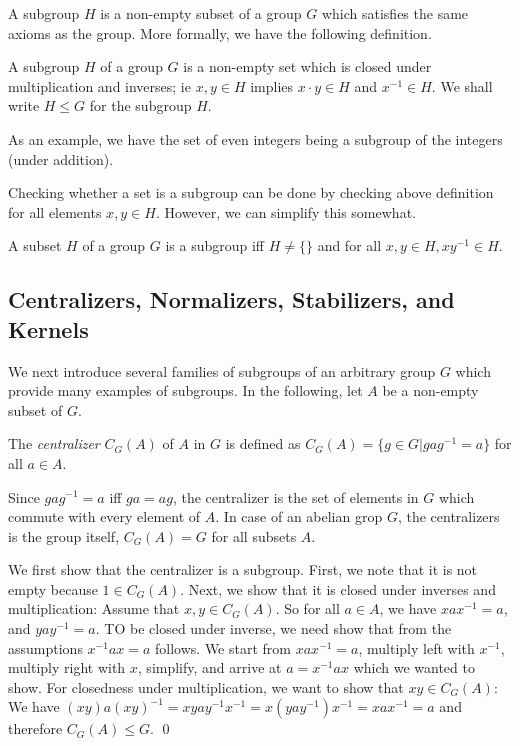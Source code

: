 
A subgroup $H$ is a non-empty subset of a group $G$ which satisfies the same axioms as the group. More formally, we have the following definition.

\begin{definition}
A subgroup $H$ of a group $G$ is a non-empty set which is closed under multiplication and inverses; ie $x, y \in H$ implies $x \cdot y \in H$ and $x^{-1} \in H$. We shall write $H \leq G$ for the subgroup $H$.
\end{definition}

As an example, we have the set of even integers being a subgroup of the integers (under addition).

Checking whether a set is a subgroup can be done by checking above definition for all elements $x, y \in H$. However, we can simplify this somewhat.

\begin{theorem}
A subset $H$ of a group $G$ is a subgroup iff $H \neq \{\}$ and for all $x, y \in H, xy^{-1} \in H$.
\end{theorem}

\subsection{Centralizers, Normalizers, Stabilizers, and Kernels}

We next introduce several families of subgroups of an arbitrary group $G$ which provide many examples of subgroups. In the following, let $A$ be a non-empty subset of $G$.

\begin{definition}
The \emph{centralizer} $C_G(A)$ of $A$ in $G$ is defined as $C_G(A) =\{g \in G | gag^{-1} = a\}$ for all $a \in A$. 
\end{definition}

Since $gag^{-1} = a$ iff $ga = ag$, the centralizer is the set of elements in $G$ which commute with every element of $A$. In case of an abelian grop $G$, the centralizers is the group itself, $C_G(A) = G$ for all subsets $A$.

We first show that the centralizer is a subgroup. First, we note that it is not empty because $1 \in C_G(A)$. Next, we show that it is closed under inverses and multiplication: Assume that $x, y \in C_G(A)$. So for all $a \in A$, we have $xax^{-1} = a$, and $yay^{-1} = a$. TO be closed under inverse, we need show that from the assumptions $x^{-1}ax = a$ follows. We start from $xax^{-1} = a$, multiply left with $x^{-1}$, multiply right with $x$, simplify, and arrive at $a = x^{-1}ax$ which we wanted to show. For closedness under multiplication, we want to show that $xy \in C_G(A)$: We have $(xy)a(xy)^{-1} = xya y^{-1} x^{-1} = x(ya y^{-1})x^{-1} = x a x^{-1} = a$ and therefore $C_G(A) \leq G$. \qed


